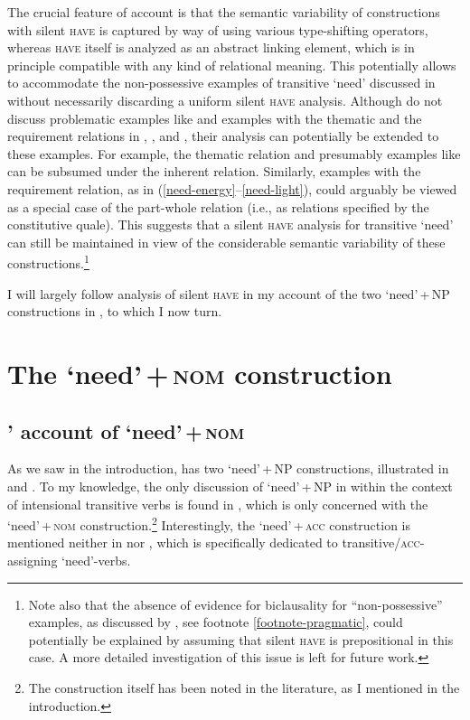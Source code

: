 \documentclass[output=paper]{langscibook}
\begin{document}
The crucial feature of  account is that the semantic variability of constructions with silent \textsc{have} is captured by way of using various type-shifting operators, whereas \textsc{have} itself is analyzed as an abstract linking element, which is in principle compatible with any kind of relational meaning. This potentially allows to accommodate the non-possessive examples of transitive `need' discussed in  without necessarily discarding a uniform silent \textsc{have} analysis.
Although \citeauthor{Zaroukian.Beller2013} do not discuss problematic examples like  and examples with the thematic and the requirement relations in , , and , their analysis can potentially be extended to these examples. For example, the thematic relation and presumably examples like  can be subsumed under the inherent relation. Similarly, examples with the requirement relation, as in (\ref{need-energy}--\ref{need-light}), could arguably be viewed as a special case of the part-whole relation (i.e., as relations specified by the constitutive quale). This suggests that a silent \textsc{have} analysis for transitive `need' can still be maintained in view of the considerable semantic variability of these constructions.\footnote{Note also that the absence of evidence for biclausality for ``non-possessive'' examples, as discussed by \citet{Schwarz2006}, see footnote \ref{footnote-pragmatic}, could potentially be explained by assuming that silent \textsc{have} is prepositional in this case. A more detailed investigation of this issue is left for future work.\label{footnote-telic}}

I will largely follow  analysis of silent \textsc{have} in my account of the two `need'\,+\,NP constructions in , to which I now turn.

\section{The `need'\,+\,\textsc{nom} construction}\label{section-nom}

\subsection{\citeauthor{Harves2008}' account of `need'\,+\,\textsc{nom}}\label{section-harves}

As we saw in the introduction,  has two `need'\,+\,NP constructions, illustrated in  and . To my knowledge, the only discussion of `need'\,+\,NP in  within the context of intensional transitive verbs is found in \citet{Harves2008}, which is only concerned with the `need'\,+\,\textsc{nom} construction.\footnote{The construction itself has been noted in the literature, as I mentioned in the introduction.} Interestingly, the `need'\,+\,\textsc{acc} construction is mentioned neither in \citet{Harves2008} nor \citet{Harves.Kayne2012}, which is specifically dedicated to transitive\slash\textsc{acc}-as\-sign\-ing `need'-verbs.
\end{document}
